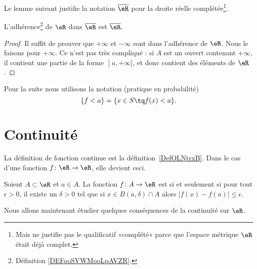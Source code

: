 Le lemme suivant justifie la notation \( \overline{ \eR }\) pour la droite réelle complétée\footnote{Mais ne justifie pas le qualificatif «complété» parce que l'espace métrique \( \eR\) était déjà complet.}.
\begin{lemma}       \label{LEMooPZXHooEEXsTC}
	L'adhérence\footnote{Définition \ref{DEFooSVWMooLpAVZR}.} de \( \eR\) dans \( \overline{ \eR }\) est \( \overline{ \eR }\).
\end{lemma}

\begin{proof}
	Il suffit de prouver que \( +\infty\) et \( -\infty\) sont dans l'adhérence de \( \eR\). Nous le faisons pour \( +\infty\). Ce n'est pas très compliqué : si \( A\) est un ouvert contenant \( +\infty\), il contient une partie de la forme \( \mathopen] a , +\infty \mathclose]\), et donc contient des éléments de \( \eR\).
\end{proof}

Pour la suite nous utilisons la notation (pratique en probabilité)
\begin{equation}
	\{ f<a \}=\{ x\in S\tq f(x)<a \}.
\end{equation}


\section{Continuité}

La définition de fonction continue est la définition~\ref{DefOLNtrxB}. Dans le cas d'une fonction \( f\colon \eR\to \eR\), elle devient ceci.
\begin{proposition}      \label{PROPooVNGEooPwbxXP}
	Soient \( A\subset \eR\) et \( a\in A\). La fonction \( f\colon A\to \eR\) est  si et seulement si pour tout \( \epsilon>0\), il existe un \( \delta>0\) tel que si \( x\in B(a,\delta)\cap A\) alors \( | f(x)-f(a) |\leq \epsilon\).
\end{proposition}

Nous allons maintenant étudier quelques conséquences de la continuité sur \( \eR\).

